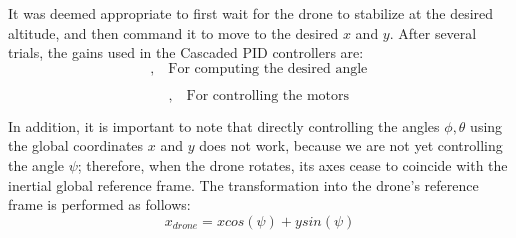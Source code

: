 \documentclass[a4paper,12pt]{article}
\begin{document}
\noindent
It was deemed appropriate to first wait for the drone to stabilize at the desired altitude, and then command it to move to the desired $x$ and $y$. After several trials, the gains used in the Cascaded PID controllers are:
\begin{equation}
    [K_p = 1, K_i = 0, K_d = 0.7],   \quad \textrm{For computing the desired angle}
\end{equation}

\begin{equation}
    [K_p = 2.95, K_i = 0.5, K_d = 2.6],   \quad \textrm{For controlling the motors}
\end{equation}

\noindent
In addition, it is important to note that directly controlling the angles $\phi, \theta$ using the global coordinates $x$ and $y$ does not work, because we are not yet controlling the angle $\psi$; therefore, when the drone rotates, its axes cease to coincide with the inertial global reference frame.
\newline
\newline
The transformation into the drone's reference frame is performed as follows:
\begin{equation}
    x_{drone} = xcos(\psi)+ysin(\psi)
\end{equation}
\end{document}
